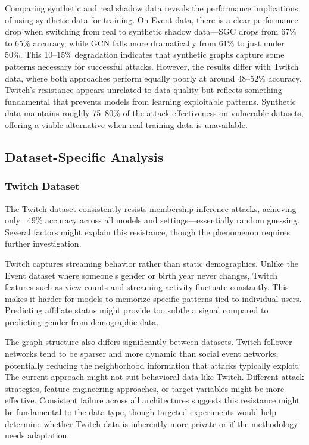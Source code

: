 \documentclass{article}
\begin{document}
Comparing synthetic and real shadow data reveals the performance implications of using synthetic data for training. On Event data, there is a clear performance drop when switching from real to synthetic shadow data---SGC drops from 67\% to 65\% accuracy, while GCN falls more dramatically from 61\% to just under 50\%. This 10--15\% degradation indicates that synthetic graphs capture some patterns necessary for successful attacks. However, the results differ with Twitch data, where both approaches perform equally poorly at around 48--52\% accuracy. Twitch's resistance appears unrelated to data quality but reflects something fundamental that prevents models from learning exploitable patterns. Synthetic data maintains roughly 75--80\% of the attack effectiveness on vulnerable datasets, offering a viable alternative when real training data is unavailable.

\subsection{Dataset-Specific Analysis}

\subsubsection{Twitch Dataset}
The Twitch dataset consistently resists membership inference attacks, achieving only ~49\% accuracy across all models and settings---essentially random guessing. Several factors might explain this resistance, though the phenomenon requires further investigation.

Twitch captures streaming behavior rather than static demographics. Unlike the Event dataset where someone's gender or birth year never changes, Twitch features such as view counts and streaming activity fluctuate constantly. This makes it harder for models to memorize specific patterns tied to individual users. Predicting affiliate status might provide too subtle a signal compared to predicting gender from demographic data.

The graph structure also differs significantly between datasets. Twitch follower networks tend to be sparser and more dynamic than social event networks, potentially reducing the neighborhood information that attacks typically exploit. The current approach might not suit behavioral data like Twitch. Different attack strategies, feature engineering approaches, or target variables might be more effective. Consistent failure across all architectures suggests this resistance might be fundamental to the data type, though targeted experiments would help determine whether Twitch data is inherently more private or if the methodology needs adaptation.
\end{document}
